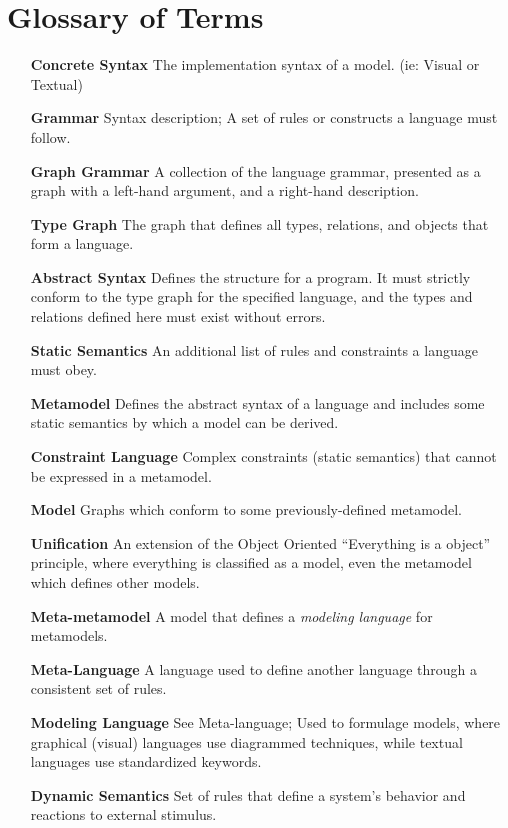 \section{Glossary of Terms}
\vspace{0.5cm}

\begin{itemize}

\item[\bf Concrete Syntax]
The implementation syntax of a model. (ie: Visual or Textual)

\item[\bf Grammar] 
Syntax description; A set of rules or constructs a language must follow.

\item[\bf Graph Grammar] 
A collection of the language grammar, presented as a graph with a left-hand argument, and a right-hand description.

\item[\bf Type Graph] 
The graph that defines all types, relations, and objects that form a language.

\item[\bf Abstract Syntax] 
Defines the structure for a program. It must strictly conform to the type graph for the specified language, and the types and relations defined here must exist
without errors.

\item[\bf Static Semantics] 
An additional list of rules and constraints a language must obey.

\item[\bf Metamodel] 
Defines the abstract syntax of a language and includes some static semantics by which a model can be derived.

\item[\bf Constraint Language] 
Complex constraints (static semantics) that cannot be expressed in a metamodel.

\item[\bf Model] 
Graphs which conform to some previously-defined metamodel.

\item[\bf Unification]  
An extension of the Object Oriented ``Everything is a object'' principle, where everything is classified as a model, even the metamodel which defines other models.

\item[\bf Meta-metamodel] 
A model that defines a \emph{modeling language} for metamodels.

\item[\bf Meta-Language] 
A language used to define another language through a consistent set of rules. 

\item[\bf Modeling Language] 
See Meta-language; Used to formulage models, where graphical (visual) languages use diagrammed techniques, while textual languages use standardized keywords.

\item[\bf Dynamic Semantics] 
Set of rules that define a system's behavior and reactions to external stimulus.

\end{itemize}